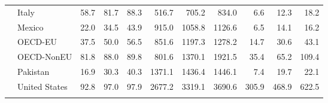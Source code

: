 \begin{table}
\begin{tabular}[t]{llrrrrrrrrr}
 & Italy & \num{58.7} & \num{81.7} & \num{88.3} & \num{516.7} & \num{705.2} & \num{834.0} & \num{6.6} & \num{12.3} & \num{18.2}\\
 & Mexico & \num{22.0} & \num{34.5} & \num{43.9} & \num{915.0} & \num{1058.8} & \num{1126.6} & \num{6.5} & \num{14.1} & \num{16.2}\\
 & OECD-EU & \num{37.5} & \num{50.0} & \num{56.5} & \num{851.6} & \num{1197.3} & \num{1278.2} & \num{14.7} & \num{30.6} & \num{43.1}\\
 & OECD-NonEU & \num{81.8} & \num{88.0} & \num{89.8} & \num{801.6} & \num{1370.1} & \num{1921.5} & \num{35.4} & \num{65.2} & \num{109.4}\\
 & Pakistan & \num{16.9} & \num{30.3} & \num{40.3} & \num{1371.1} & \num{1436.4} & \num{1446.1} & \num{7.4} & \num{19.7} & \num{22.1}\\
 & United States & \num{92.8} & \num{97.0} & \num{97.9} & \num{2677.2} & \num{3319.1} & \num{3690.6} & \num{305.9} & \num{468.9} & \num{622.5}\\
\addlinespace\bottomrule
\end{tabular}
\end{table}
